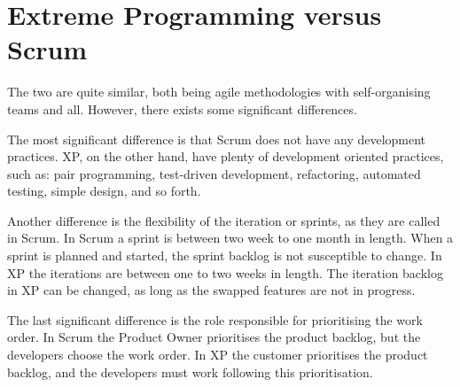 \section{Extreme Programming versus Scrum}
The two are quite similar, both being agile methodologies with self-organising teams and all. 
However, there exists some significant differences.

The most significant difference is that Scrum does not have any development practices.
XP, on the other hand, have plenty of development oriented practices, such as: pair programming, test-driven development, refactoring, automated testing, simple design, and so forth.

Another difference is the flexibility of the iteration or sprints, as they are called in Scrum.
In Scrum a sprint is between two week to one month in length.
When a sprint is planned and started, the sprint backlog is not susceptible to change.
In XP the iterations are between one to two weeks in length.
The iteration backlog in XP can be changed, as long as the swapped features are not in progress.

The last significant difference is the role responsible for prioritising the work order.
In Scrum the Product Owner prioritises the product backlog, but the developers choose the work order.
In XP the customer prioritises the product backlog, and the developers must work following this prioritisation. 